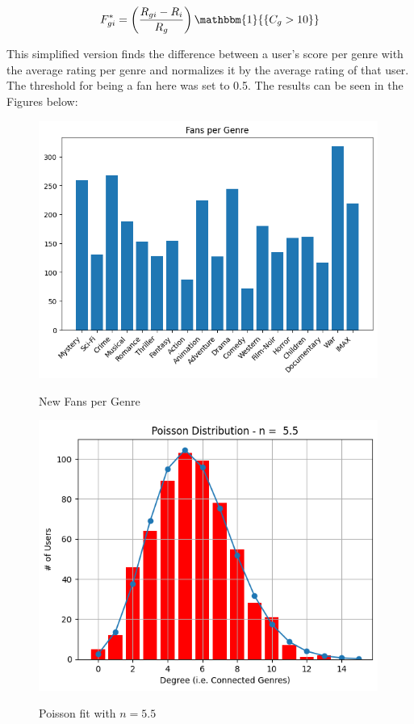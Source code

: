 \documentclass[12pt]{article}
\numberwithin{equation}{section}
\begin{document}
\[
F_{gi}^* = \left(\frac{R_{gi} - R_i}{R_g}\right)\mathbbm{1}{\{C_g > 10\}}
\]

This simplified version finds the difference between a user's score per genre with the average rating per genre and normalizes it by the average rating of that user. The threshold for being a fan here was set to 0.5. The results can be seen in the Figures below:

\begin{figure}[h!]
    \begin{minipage}[b]{0.5\linewidth}
         \centering
  	\includegraphics[width=0.99\textwidth]{fansgenre1.png}
  	\label{fig:fanspergenre}
	 \caption{New Fans per Genre}
    \end{minipage} 
    \hspace{0.1cm}
    \begin{minipage}[b]{0.5\linewidth}
         \centering
  	\includegraphics[width=0.99\textwidth]{poissondegree.png}
  	\label{fig:fanspergenre}
	 \caption{Poisson fit with $n = 5.5$}
    \end{minipage} 
\end{figure}
\end{document}
